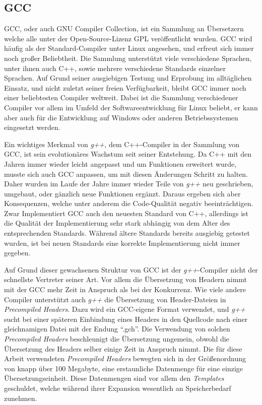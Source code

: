 \subsection{GCC}
GCC, oder auch GNU Compiler Collection, ist ein Sammlung an Übersetzern welche alle unter der Open-Source-Lizenz GPL veröffentlicht wurden. GCC wird häufig als der Standard-Compiler unter Linux angesehen,
und erfreut sich immer noch großer Beliebtheit. Die Sammlung unterstützt viele verschiedene Sprachen, unter ihnen auch C++, sowie mehrere verschiedene Standards einzelner Sprachen. Auf Grund seiner
ausgiebigen Testung und Erprobung im alltäglichen Einsatz, und nicht zuletzt seiner freien Verfügbarkeit, bleibt GCC immer noch einer beliebtesten Compiler weltweit. Dabei ist die Sammlung verschiedener
Compiler vor allem im Umfeld der Softwareentwicklung für Linux beliebt, er kann aber auch für die Entwicklung auf Windows oder anderen Betriebssystemen eingesetzt werden.

Ein wichtiges Merkmal von \textit{g++}, dem C++-Compiler in der Sammlung von GCC, ist sein evolutionäres Wachstum seit seiner Entstehung. Da C++ mit den Jahren immer wieder leicht angepasst und um Funktionen
erweitert wurde, musste sich auch GCC anpassen, um mit diesen Änderungen Schritt zu halten. Daher wurden im Laufe der Jahre immer wieder Teile von \textit{g++} neu geschrieben, umgebaut, oder gänzlich
neue Funktionen ergänzt. Daraus ergeben sich aber Konsequenzen, welche unter anderem die Code-Qualität negativ beeinträchtigen. Zwar Implementiert GCC auch den neuesten Standard von C++, allerdings
ist die Qualität der Implementierung sehr stark abhängig von dem Alter des entsprechenden Standards. Während ältere Standards bereits ausgiebig getestet wurden, ist bei neuen Standards eine korrekte 
Implementierung nicht immer gegeben. 

Auf Grund dieser gewachsenen Struktur von GCC ist der \textit{g++}-Compiler nicht der schnellste Vertreter seiner Art. Vor allem die Übersetzung von Headern nimmt mit der GCC mehr Zeit in Anspruch als
bei der Konkurrenz. Wie viele andere Compiler unterstützt auch \textit{g++} die Übersetzung von Header-Dateien in \textit{Precompiled Headers}. Dazu wird ein GCC-eigene Format verwendet, und \textit{g++} sucht bei einer
späteren Einbindung eines Headers in den Quellcode nach einer gleichnamigen Datei mit der Endung ``.gch''. Die Verwendung von solchen \textit{Precompiled Headers} beschleunigt die Übersetzung ungemein, 
obwohl die Übersetzung des Headers selber einige Zeit in Anspruch nimmt. Die für diese Arbeit verwendeten \textit{Precompiled Headers} bewegten sich in der Größenordnung von knapp über 100 Megabyte, 
eine erstaunliche Datenmenge für eine einzige Übersetzungseinheit. Diese Datenmengen sind vor allem den \textit{Templates} geschuldet, welche während ihrer Expansion wesentlich an Speicherbedarf zunehmen.

